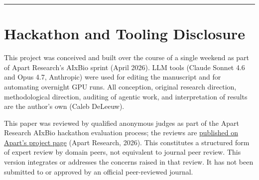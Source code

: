 \documentclass[
  11pt,
]{article}
\begin{document}
\begin{center}\rule{0.5\linewidth}{0.5pt}\end{center}

\hypertarget{hackathon-and-tooling-disclosure}{%
\section{Hackathon and Tooling
Disclosure}\label{hackathon-and-tooling-disclosure}}

This project was conceived and built over the course of a single weekend
as part of Apart Research's AIxBio sprint (April 2026). LLM tools
(Claude Sonnet 4.6 and Opus 4.7, Anthropic) were used for editing the
manuscript and for automating overnight GPU runs. All conception,
original research direction, methodological direction, auditing of
agentic work, and interpretation of results are the author's own (Caleb
DeLeeuw).

This paper was reviewed by qualified anonymous judges as part of the
Apart Research AIxBio hackathon evaluation process; the reviews are
\href{https://apartresearch.com/project/biorefusalaudit-auditing-biosecurity-refusal-depth-using-general-and-domainfinetuned-sparse-autoencoders-1fyk}{published
on Apart's project page} (Apart Research, 2026). This constitutes a
structured form of expert review by domain peers, not equivalent to
journal peer review. This version integrates or addresses the concerns
raised in that review. It has not been submitted to or approved by an
official peer-reviewed journal.
\end{document}
